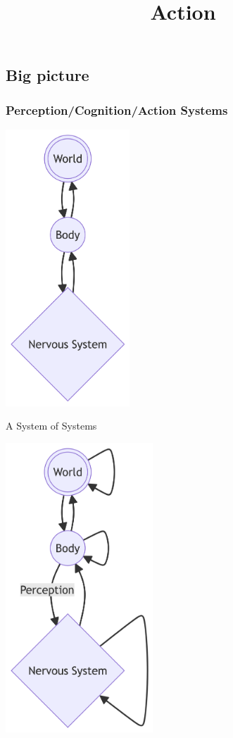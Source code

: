 \documentclass[
  letterpaper,
  DIV=11,
  numbers=noendperiod]{scrartcl}
\title{Action}
\author{}
\date{}
\begin{document}
\maketitle

\subsection{Big picture}\label{big-picture}

\subsubsection{Perception/Cognition/Action
Systems}\label{perceptioncognitionaction-systems}

\includegraphics[width=1.84in,height=4.09in]{action_files/figure-latex/mermaid-figure-1.png}

A System of Systems

\includegraphics[width=2.18in,height=4.28in]{action_files/figure-latex/mermaid-figure-5.png}
\end{document}
